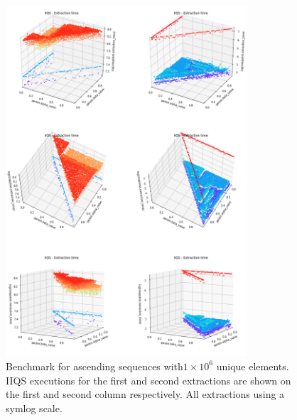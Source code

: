 \begin{figure}[!ht]
    \centering
    \includegraphics[width=0.8\textwidth]{./fragments/04_experimental_execution/images/04_alphabeta_singleclass_asc.png}
    \caption{Benchmark for ascending sequences with$1\times10^6$ unique elements. IIQS executions for the first and second extractions are shown on the first and second column respectively. All extractions using a symlog scale.}
    \label{FIG:05_ALPHABETA_RELATIONSHIP_ASC}
\end{figure}

